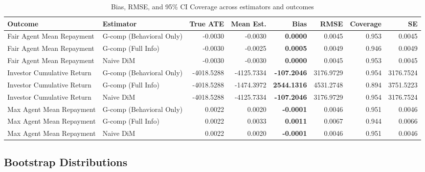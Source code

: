 \documentclass[
]{article}
\begin{document}
\begin{longtable}[t]{llrr>{}rrrr}
\caption{\label{tab:eval-table-display}Bias, RMSE, and 95\% CI Coverage across estimators and outcomes}\\
\toprule
Outcome & Estimator & True ATE & Mean Est. & Bias & RMSE & Coverage & SE\\
\midrule
Fair Agent Mean Repayment & G-comp (Behavioral Only) & -0.0030 & -0.0030 & \textbf{0.0000} & 0.0045 & 0.953 & 0.0045\\
Fair Agent Mean Repayment & G-comp (Full Info) & -0.0030 & -0.0025 & \textbf{0.0005} & 0.0049 & 0.946 & 0.0049\\
Fair Agent Mean Repayment & Naive DiM & -0.0030 & -0.0030 & \textbf{0.0000} & 0.0045 & 0.953 & 0.0045\\
Investor Cumulative Return & G-comp (Behavioral Only) & -4018.5288 & -4125.7334 & \textbf{-107.2046} & 3176.9729 & 0.954 & 3176.7524\\
Investor Cumulative Return & G-comp (Full Info) & -4018.5288 & -1474.3972 & \textbf{2544.1316} & 4531.2748 & 0.894 & 3751.5223\\
\addlinespace
Investor Cumulative Return & Naive DiM & -4018.5288 & -4125.7334 & \textbf{-107.2046} & 3176.9729 & 0.954 & 3176.7524\\
Max Agent Mean Repayment & G-comp (Behavioral Only) & 0.0022 & 0.0020 & \textbf{-0.0001} & 0.0046 & 0.951 & 0.0046\\
Max Agent Mean Repayment & G-comp (Full Info) & 0.0022 & 0.0033 & \textbf{0.0011} & 0.0067 & 0.944 & 0.0066\\
Max Agent Mean Repayment & Naive DiM & 0.0022 & 0.0020 & \textbf{-0.0001} & 0.0046 & 0.951 & 0.0046\\
\bottomrule
\end{longtable}
\endgroup{}

\subsection{Bootstrap Distributions}\label{bootstrap-distributions}
\end{document}
